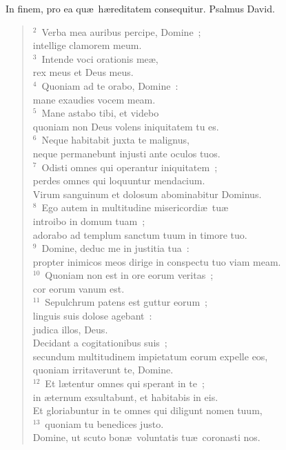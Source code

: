 \lettrine[lines=3,image=true,loversize=0.05,lraise=-0.03]{I}{}n finem, pro ea qu\ae\ h\ae reditatem consequitur. Psalmus David.
\begin{flushleft}\begin{verse}\vspace{6pt}${}^{2}$~Verba mea auribus percipe, Domine~;\\ intellige clamorem meum.\\
${}^{3}$~Intende voci orationis me\ae ,\\ rex meus et Deus meus.\\
${}^{4}$~Quoniam ad te orabo, Domine~:\\ mane exaudies vocem meam.\\
${}^{5}$~Mane astabo tibi, et videbo\\ quoniam non Deus volens iniquitatem tu es.\\
${}^{6}$~Neque habitabit juxta te malignus,\\ neque permanebunt injusti ante oculos tuos.\\
${}^{7}$~Odisti omnes qui operantur iniquitatem~;\\ perdes omnes qui loquuntur mendacium.\\ Virum sanguinum et dolosum abominabitur Dominus.\\
${}^{8}$~Ego autem in multitudine misericordi\ae\ tu\ae \\ introibo in domum tuam~;\\ adorabo ad templum sanctum tuum in timore tuo.\\
${}^{9}$~Domine, deduc me in justitia tua~:\\ propter inimicos meos dirige in conspectu tuo viam meam.\\
${}^{10}$~Quoniam non est in ore eorum veritas~;\\ cor eorum vanum est.\\
${}^{11}$~Sepulchrum patens est guttur eorum~;\\ linguis suis dolose agebant~:\\ judica illos, Deus.\\ Decidant a cogitationibus suis~;\\ secundum multitudinem impietatum eorum expelle eos,\\ quoniam irritaverunt te, Domine.\\
${}^{12}$~Et l\ae tentur omnes qui sperant in te~;\\ in \ae ternum exsultabunt, et habitabis in eis.\\ Et gloriabuntur in te omnes qui diligunt nomen tuum,\\
${}^{13}$~quoniam tu benedices justo.\\ Domine, ut scuto bon\ae\ voluntatis tu\ae\ coronasti nos.\end{verse}\end{flushleft}



